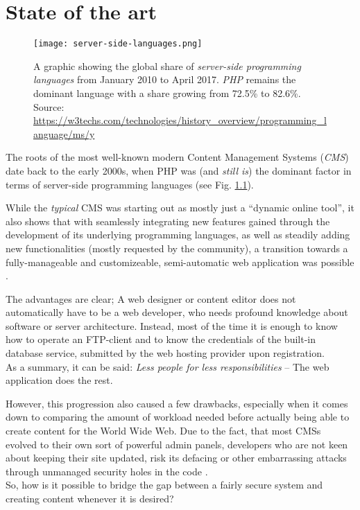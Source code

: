 \chapter{State of the art}
\label{cha:state-of-the-art}

\begin{figure}
    \centering
    \texttt{[image: server-side-languages.png]}
    \caption{A graphic showing the global share of \emph{server-side programming languages} from January 2010 to April 2017. \emph{PHP} remains the dominant language with a share growing from 72.5\% to 82.6\%.\\
    Source: \url{https://w3techs.com/technologies/history_overview/programming_language/ms/y}}
    \label{fig:server-side-languages}
\end{figure}
%

The roots of the most well-known modern Content Management Systems (\emph{CMS}) date back to the early 2000s, when PHP was (and \emph{still is}) the dominant factor in terms of server-side programming languages (see Fig. \ref{fig:server-side-languages}). %

While the \emph{typical} CMS was starting out as mostly just a ``dynamic online tool'', it also shows that with seamlessly integrating new features gained through the development of its underlying programming languages, as well as steadily adding new functionalities (mostly requested by the community), a transition towards a fully-manageable and customizeable, semi-automatic web application was possible \cite[17]{dhillon2016}.

The advantages are clear; A web designer or content editor does not automatically have to be a web developer, who needs profound knowledge about software or server architecture. Instead, most of the time it is enough to know how to operate an FTP-client and to know the credentials of the built-in database service, submitted by the web hosting provider upon registration.\\
As a summary, it can be said: \emph{Less people for less responsibilities} -- The web application does the rest.

However, this progression also caused a few drawbacks, especially when it comes down to comparing the amount of workload needed before actually being able to create content for the World Wide Web. Due to the fact, that most CMSs evolved to their own sort of powerful admin panels, developers who are not keen about keeping their site updated, risk its defacing or other embarrassing attacks through unmanaged security holes in the code \cite[23]{dhillon2016}.\\
So, how is it possible to bridge the gap between a fairly secure system and creating content whenever it is desired?

